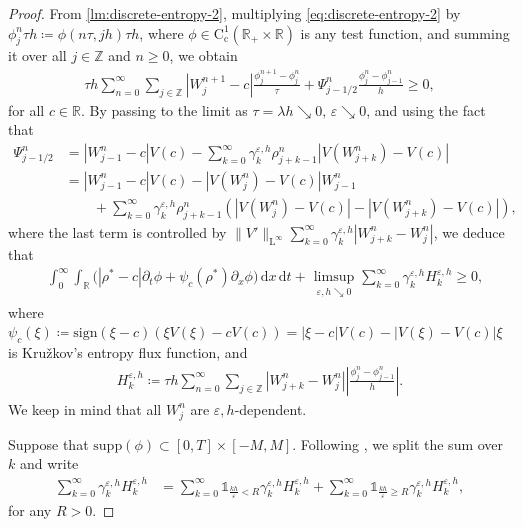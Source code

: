 \documentclass[10pt]{amsart}
\theoremstyle{plain}
\theoremstyle{definition}
\numberwithin{equation}{section}
\newcommand{\eps}{{\varepsilon}}
\newcommand{\sgn}[1]{\mathrm{sign}\left(#1\right)}
\newcommand{\dd}{\,\mathrm{d}}
\begin{document}
\begin{proof}
From \cref{lm:discrete-entropy-2}, multiplying \cref{eq:discrete-entropy-2} by $ \phi_j^n \tau h\coloneqq\phi(n\tau,jh)\tau h$, where $\phi\in \mathrm{C}_{\mathrm{c}}^1(\mathbb{R}_+\times\mathbb{R})$ is any test function, and summing it over all $j\in\mathbb{Z}$ and $n\geq0$, we obtain
\begin{align*}
    \tau h\sum_{n=0}^\infty\sum_{j\in\mathbb{Z}} |W_j^{n+1}-c| \frac{\phi_j^{n+1}-\phi_j^n}{\tau} + \Psi_{j-1/2}^n \frac{\phi_j^n-\phi_{j-1}^n}{h} \geq 0,
\end{align*}
for all $c\in\mathbb{R}$. By passing to the limit as $\tau=\lambda h\searrow 0,\,\eps\searrow 0$, and using the fact that
\begin{align*}
    \Psi_{j-1/2}^n &= |W_{j-1}^n-c|V(c) - \sum_{k=0}^\infty \gamma_k^{\eps,h} \rho_{j+k-1}^n \left|V(W_{j+k}^n)-V(c)\right| \\
    &= |W_{j-1}^n-c|V(c) - \left|V(W_j^n)-V(c)\right| W_{j-1}^n \\
    &\qquad + \sum_{k=0}^\infty \gamma_k^{\eps,h} \rho_{j+k-1}^n \left( \left|V(W_j^n)-V(c)\right| - \left|V(W_{j+k}^n)-V(c)\right| \right),
\end{align*}
where the last term is controlled by $\|V'\|_{\mathrm{L}^\infty} \sum_{k=0}^\infty \gamma_k^{\eps,h} |W_{j+k}^n - W_j^n|$,
we deduce that
\begin{align*}
    &\int_0^\infty\int_{\mathbb{R}} \big( |\rho^\ast-c|\partial_t\phi + \psi_c(\rho^\ast)\partial_x\phi \big) \dd x\dd t + \limsup_{\substack{\eps,h\searrow0}} \sum_{k=0}^\infty \gamma_k^{\eps,h} H^{\eps,h}_k \geq 0,
\end{align*}
where $\psi_c(\xi)\coloneqq\sgn{\xi-c}(\xi V(\xi)-cV(c))=|\xi-c|V(c)-|V(\xi)-V(c)|\xi$ is Kru\v{z}kov's entropy flux function, and
\begin{align*}
    H^{\eps,h}_k \coloneqq \tau h \sum_{n=0}^\infty\sum_{j\in\mathbb{Z}} |W_{j+k}^n - W_j^n| \left|\frac{\phi_j^n - \phi_{j-1}^n}{h}\right|.
\end{align*}
We keep in mind that all $W_j^n$ are $\eps,h$-dependent.

Suppose that $\mathrm{supp}(\phi)\subset[0,T]\times[-M,M]$. Following \cite[Lemma 4.1 and Theorem 1.2]{MR4553943}, we split the sum over \( k \) and write
\begin{align*}
\sum_{k=0}^\infty \gamma_k^{\eps,h} H^{\eps,h}_k
&= \sum_{k=0}^\infty \mathds{1}_{\frac{kh}\eps< R}\gamma_k^{\eps,h} H^{\eps,h}_k + \sum_{k=0}^\infty \mathds{1}_{\frac{kh}\eps\ge R}\gamma_k^{\eps,h} H^{\eps,h}_k,
\end{align*}
for any $R>0$.


\end{proof}
\end{document}
